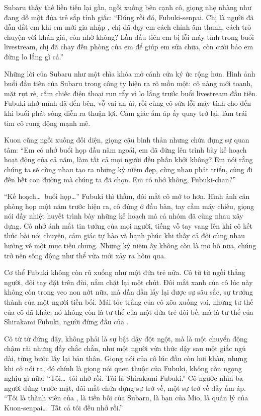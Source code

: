 \documentclass[../main.tex]{subfiles}
\begin{document}
Subaru thấy thế liền tiến lại gần, ngồi xuống bên cạnh cô, giọng nhẹ nhàng như đang dỗ một đứa trẻ sắp tỉnh giấc: ``Đúng rồi đó, Fubuki-senpai. Chị là người đã dẫn dắt em khi em mới gia nhập \hll, chị đã dạy em cách chỉnh âm thanh, cách trò chuyện với khán giả, còn nhớ không? Lần đầu tiên em bị lỗi máy tính trong buổi livestream, chị đã chạy đến phòng của em để giúp em sửa chữa, còn cười bảo em đừng lo lắng gì cả.''

Những lời của Subaru như một chìa khóa mở cánh cửa ký ức rộng hơn. Hình ảnh buổi đầu tiên của Subaru trong công ty hiện ra rõ mồn một: cô nàng mới toanh, mặt rụt rè, cầm chiếc điện thoại run rẩy vì lo lắng trước buổi livestream đầu tiên. Fubuki nhớ mình đã đến bên, vỗ vai an ủi, rồi cùng cô sửa lỗi máy tính cho đến khi buổi phát sóng diễn ra thuận lợi. Cảm giác ấm áp ấy quay trở lại, làm trái tim cô rung động mạnh mẽ.

Kuon cũng ngồi xuống đối diện, giọng cậu bình thản nhưng chứa đựng sự quan tâm: ``Em có nhớ buổi họp đầu năm ngoái, em đã đứng lên trình bày kế hoạch hoạt động của cả năm, làm tất cả mọi người đều phấn khởi không? Em nói rằng chúng ta sẽ cùng nhau tạo ra những kỷ niệm đẹp, cùng nhau phát triển, cùng đi đến hết con đường mà chúng ta đã chọn. Em có nhớ không, Fubuki-chan?''

``Kế hoạch\dots\ buổi họp\dots'' Fubuki thì thầm, đôi mắt cô mở to hơn. Hình ảnh căn phòng họp một năm trước hiện ra, cô đứng ở đầu bàn, tay cầm máy chiếu, giọng nói đầy nhiệt huyết trình bày những kế hoạch mà cả nhóm đã cùng nhau xây dựng. Cô nhớ ánh mắt tin tưởng của mọi người, tiếng vỗ tay vang lên khi cô kết thúc bài nói chuyện, cảm giác tự hào và hạnh phúc khi thấy cả đội cùng nhau hướng về một mục tiêu chung. Những kỷ niệm ấy không còn là mơ hồ nữa, chúng trở nên sống động như thể vừa mới xảy ra hôm qua.

Cơ thể Fubuki không còn rũ xuống như một đứa trẻ nữa. Cô từ từ ngồi thẳng người, đôi tay đặt trên đùi, nắm chặt lại một chút. Đôi mắt xanh của cô lúc này không còn trong veo non nớt nữa, mà dần dần lấy lại được sự sâu sắc, sự trưởng thành của một người tiền bối. Mái tóc trắng của cô xõa xuống vai, nhưng tư thế của cô đã khác; nó không còn là tư thế của một đứa trẻ đòi bế, mà là tư thế của Shirakami Fubuki, người đứng đầu của \hll.


Cô từ từ đứng dậy, không phải là sự bật dậy đột ngột, mà là một chuyển động chậm rãi nhưng đầy chắc chắn, như một người vừa thức dậy sau một giấc ngủ dài, từng bước lấy lại bản thân. Giọng nói của cô lúc đầu còn hơi khàn, nhưng khi cô nói ra, đó chính là giọng nói quen thuộc của Fubuki, không còn ngọng nghịu gì nữa: ``Tôi\dots\ tôi nhớ rồi. Tôi là Shirakami Fubuki.'' Cô ngước nhìn ba người đứng trước mặt, đôi mắt chứa đựng sự trở về, một sự trở về đầy ấm áp. ``Tôi là thành viên của \hll, là tiền bối của Subaru, là bạn của Mio, là quản lý của Kuon-senpai\dots\ Tất cả tôi đều nhớ rồi.''
\end{document}

